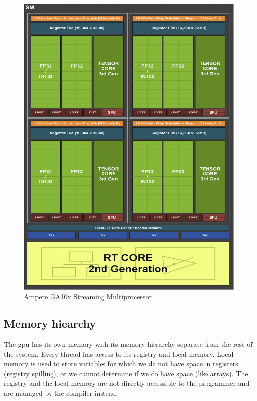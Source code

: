 \begin{figure}[H]
  \centering
  \includegraphics[width=\textwidth]{components/figure/ampere-sm.png}
  \caption{Ampere GA10x Streaming Multiprocessor \cite{nvidiaampere}}
  \label{figure:ampere-sm}
\end{figure}

\subsection{Memory hiearchy} \label{label:gpu:mem}

The \acrshort{gpu} has its own memory with its memory hierarchy separate from the rest of the system. Every thread has access to its registry and local memory. Local memory is used to store variables for which we do not have space in registers (registry spilling), or we cannot determine if we do have space (like arrays). The registry and the local memory are not directly accessible to the programmer and are managed by the compiler instead.


